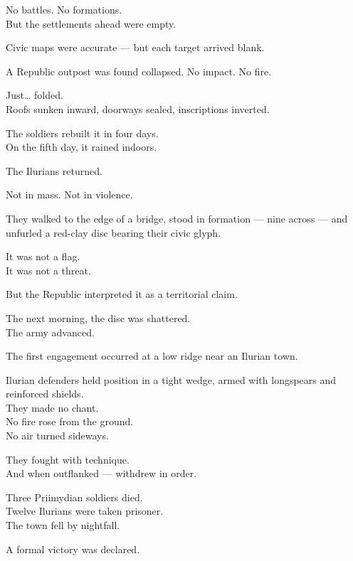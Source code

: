 \documentclass[12pt]{article}
\begin{document}
No battles. No formations.\\
But the settlements ahead were empty.

Civic maps were accurate --- but each target arrived blank.

\vspace{1em}

A Republic outpost was found collapsed. No impact. No fire.

Just… folded.\\
Roofs sunken inward, doorways sealed, inscriptions inverted.

The soldiers rebuilt it in four days.\\
On the fifth day, it rained indoors.

\vspace{1em}

The Ilurians returned.

Not in mass. Not in violence.

They walked to the edge of a bridge, stood in formation --- nine across --- and unfurled a red-clay disc bearing their civic glyph.

It was not a flag.\\
It was not a threat.

But the Republic interpreted it as a territorial claim.

The next morning, the disc was shattered.\\
The army advanced.

\vspace{1em}

The first engagement occurred at a low ridge near an Ilurian town.

Ilurian defenders held position in a tight wedge, armed with longspears and reinforced shields.\\
They made no chant.\\
No fire rose from the ground.\\
No air turned sideways.

They fought with technique.\\
And when outflanked --- withdrew in order.

Three Priimydian soldiers died.\\
Twelve Ilurians were taken prisoner.\\
The town fell by nightfall.

A formal victory was declared.

\vspace{1em}
\end{document}
